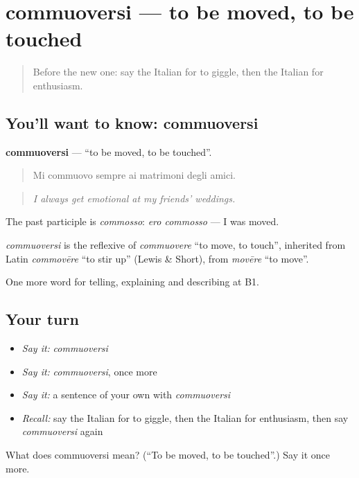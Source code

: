 \section[commuoversi]{commuoversi — to be moved, to be touched}

\label{lesson:IT-C479-commuoversi}



\begin{quote}
Before the new one: say the Italian for to giggle, then the Italian for enthusiasm.
\end{quote}

\subsection*{You'll want to know: commuoversi}
\textbf{commuoversi} — \textquotedblleft{}to be moved, to be touched\textquotedblright{}.

\begin{quote}
Mi commuovo sempre ai matrimoni degli amici.
\end{quote}

\begin{quote}
\emph{I always get emotional at my friends' weddings.}
\end{quote}

The past participle is \emph{commosso}: \emph{ero commosso} — I was moved.

\begin{cousinweb}
\emph{commuoversi} is the reflexive of \emph{commuovere} \textquotedblleft{}to move, to touch\textquotedblright{}, inherited from Latin \emph{commovēre} \textquotedblleft{}to stir up\textquotedblright{} (Lewis \& Short), from \emph{movēre} \textquotedblleft{}to move\textquotedblright{}.
\end{cousinweb}

\begin{grammarlens}[title={What you've built}]
One more word for telling, explaining and describing at B1.
\end{grammarlens}

\subsection*{Your turn}
\begin{itemize}
\raggedright
  \item \emph{Say it:} \emph{commuoversi}
  \item \emph{Say it:} \emph{commuoversi}, once more
  \item \emph{Say it:} a sentence of your own with \emph{commuoversi}
  \item \emph{Recall:} say the Italian for to giggle, then the Italian for enthusiasm, then say \emph{commuoversi} again
\end{itemize}

\begin{tcolorbox}[breakable,colback=teal!4,colframe=teal!35!black,title={Before you move on}]
What does commuoversi mean? (\textquotedblleft{}To be moved, to be touched\textquotedblright{}.) Say it once more.
\end{tcolorbox}
